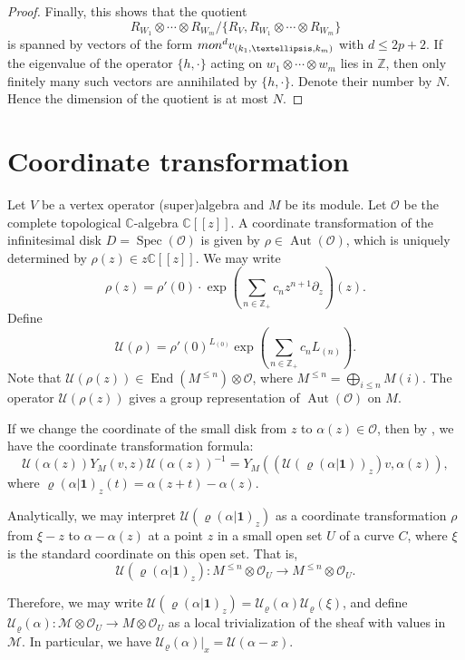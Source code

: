 \documentclass[9pt]{amsart}
\newcommand{\Z}{\mathbb{Z}}      %
\begin{document}
\begin{proof}
Finally, this shows that the quotient
\[
R_{W_1} \otimes \cdots \otimes R_{W_m} / \{R_V, R_{W_1} \otimes \cdots \otimes R_{W_m}\}
\]
is spanned by vectors of the form ${\rm mon}^d v_{(k_1,\ldots,k_m)}$ with $d \leq 2p + 2$. If the eigenvalue of the operator \( \{ h, \cdot \} \) acting on \( w_1 \otimes \cdots \otimes w_m \) lies in \( \mathbb{Z} \), then only finitely many such vectors are annihilated by \( \{ h, \cdot \} \). Denote their number by $N$. Hence the dimension of the quotient is at most $N$.
\end{proof}

\appendix
\section{Coordinate transformation}
Let $V$ be a vertex operator (super)algebra and $M$ be its module. 
Let $\mathcal{O}$ be the complete topological $\mathbb{C}$-algebra $\mathbb{C}[[z]]$. A coordinate transformation of the infinitesimal disk $D=\operatorname{Spec}(\mathcal{O})$ is given by $\rho \in \operatorname{Aut}(\mathcal{O})$, which is uniquely determined by $\rho(z) \in z\mathbb{C}[[z]]$. We may write
\[
\rho(z)=\rho'(0)\cdot \exp\left(\sum_{n\in \Z_+}c_{n}z^{n+1}\partial_{z}\right)(z).
\]
Define
\[
\mathcal{U}(\rho)=\rho'(0)^{L_{(0)}}\exp\left(\sum_{n\in \Z_+} c_{n}L_{(n)}\right).
\]
Note that $\mathcal{U}(\rho(z)) \in \operatorname{End}(M^{\leq n})\otimes \mathcal{O}$, where $M^{\leq n} = \bigoplus_{i\leq n} M{(i)}$. The operator $\mathcal{U}(\rho(z))$ gives a group representation of $\operatorname{Aut}(\mathcal{O})$ on $M$.

If we change the coordinate of the small disk from $z$ to $\alpha(z)\in \mathcal{O}$, then by \cite{huang1997two}, we have the coordinate transformation formula:
\[
\mathcal{U}(\alpha(z))Y_{M}(v,z)\mathcal{U}(\alpha(z))^{-1} = Y_M((\mathcal{U}(\varrho(\alpha|\mathbf{1}))_{z})v,\alpha(z)),
\]
where $\varrho(\alpha|\mathbf{1})_{z}(t) = \alpha(z+t) - \alpha(z)$.

Analytically, we may interpret $\mathcal{U}(\varrho(\alpha|\mathbf{1})_{z})$ as a coordinate transformation $\rho$ from $\xi - z$ to $\alpha - \alpha(z)$ at a point $z$ in a small open set $U$ of a curve $C$, where $\xi$ is the standard coordinate on this open set. That is,
\[
\mathcal{U}(\varrho(\alpha|\mathbf{1})_{z}): M^{\leq n} \otimes \mathcal{O}_{U} \rightarrow M^{\leq n} \otimes \mathcal{O}_{U}.
\]

Therefore, we may write $\mathcal{U}(\varrho(\alpha|\mathbf{1})_{z}) = \mathcal{U}_{\varrho}(\alpha)\mathcal{U}_{\varrho}(\xi)$, and define $\mathcal{U}_{\varrho}(\alpha): \mathcal{M} \otimes \mathcal{O}_{U} \rightarrow M \otimes \mathcal{O}_{U}$ as a local trivialization of the sheaf with values in $\mathcal{M}$. In particular, we have $\mathcal{U}_{\varrho}(\alpha)|_{x} = \mathcal{U}(\alpha - x)$. 
\end{document}
